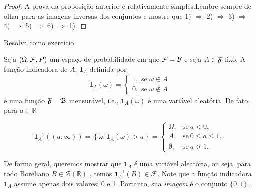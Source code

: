 \begin{frame}
\begin{proof}
	A prova da proposição anterior é relativamente simples.Lembre sempre de olhar para as imagens inversas dos conjuntos e  mostre que 1) $\Rightarrow$ 2) $\Rightarrow$ 3) $\Rightarrow$ 4) $\Rightarrow$ 5) $\Rightarrow$ 6) $\Rightarrow$ 1). 
\end{proof}

Resolva como exercício.
\begin{exem}
Seja $(\Omega, {\cal F}, P)$ um espaço de probabilidade em que ${\cal F} = {\cal
B}$ e seja $A\in \frak{F}$ fixo. A função indicadora de $A$, $\mathbf{1}_{A}$ definida por
\begin{equation*}
\mathbf{1}_{A}\left( \omega \right) =\left\{ 
\begin{array}{c}
1,\text{ se }\omega \in A \\ 
0,\text{ se }\omega \notin A
\end{array}
\right.
\end{equation*}
é uma função $\frak{F-B}$ mensurável, i.e., $\mathbf{1}_{A}\left( \omega \right)$ é uma
variável aleatória. De fato, para $a\in \mathbb{R}$

\begin{equation*}
\mathbf{1}_{A}^{-1}\left( \left( a,\infty \right) \right) =\left\{ \omega
:\mathbf{1}_{A}\left( \omega \right) >a\right\} =
\begin{cases}
\Omega, & \text{se} \ a<0, \\ 
A, & \text{se} \  0\leq a\leq 1,\\ 
\emptyset, &\text{se} \ a>1.
\end{cases}
\end{equation*}
\end{exem}
De forma geral, queremos mostrar que \( \mathbf{1}_A \) é uma variável aleatória, ou seja, para todo Boreliano \( B \in \mathcal{B}(\mathbb{R}) \) , temos \( \mathbf{1}_A^{-1}(B) \in \mathcal{F} \).  Note que a função indicadora \( \mathbf{1}_A \) assume apenas dois valores: 0 e 1. Portanto, sua {\it imagem} é o conjunto \( \{0, 1\} \).
\end{frame}


